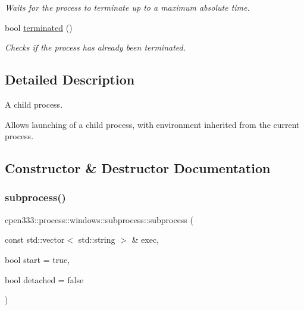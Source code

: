 \begin{DoxyCompactItemize}
\begin{DoxyCompactList}\small\item\em Waits for the process to terminate up to a maximum absolute time. \end{DoxyCompactList}\item 
bool \hyperlink{classcpen333_1_1process_1_1windows_1_1subprocess_a7fc3a589bdd4cde9adb09fc3debf9bc9}{terminated} ()
\begin{DoxyCompactList}\small\item\em Checks if the process has already been terminated. \end{DoxyCompactList}\end{DoxyCompactItemize}


\subsection{Detailed Description}
A child process. 

Allows launching of a child process, with environment inherited from the current process. 

\subsection{Constructor \& Destructor Documentation}
\mbox{\label{classcpen333_1_1process_1_1windows_1_1subprocess_ab927ab6d2b499cb7079bc2dedbd670ff}} 
\subsubsection{\texorpdfstring{subprocess()}{subprocess()}}
{\footnotesize\ttfamily cpen333\+::process\+::windows\+::subprocess\+::subprocess (\begin{DoxyParamCaption}\item[{const std\+::vector$<$ std\+::string $>$ \&}]{exec,  }\item[{bool}]{start = {\ttfamily true},  }\item[{bool}]{detached = {\ttfamily false} }\end{DoxyParamCaption})\hspace{0.3cm}{\ttfamily [inline]}}



